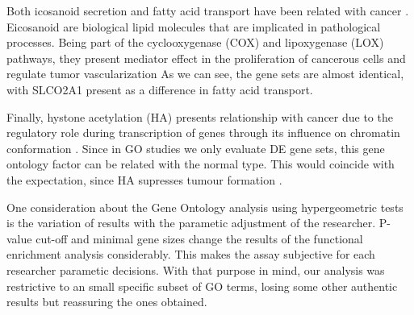 \documentclass[9pt,twocolumn,twoside]{gsajnl}
\begin{document}
Both icosanoid secretion and fatty acid transport have been related with cancer \citep{fat1,fat2}. Eicosanoid are biological lipid molecules that are implicated in pathological processes. Being part of the  cyclooxygenase (COX) and lipoxygenase (LOX) pathways, they present mediator effect in the proliferation of cancerous cells and regulate tumor vascularization \citep{fatvascu} As we can see, the gene sets are almost identical, with SLCO2A1 present as a difference in fatty acid transport.

Finally, hystone acetylation (HA) presents relationship with cancer due to the regulatory role during transcription of genes through its influence on chromatin conformation \citep{histoneacet, histoneacet2, histoneacet3, histoneacet4}. Since in GO studies we only evaluate DE gene sets, this gene ontology factor can be related with the normal type. This would coincide with the expectation, since HA supresses tumour formation \cite{histonea}.


One consideration about the Gene Ontology analysis using hypergeometric tests is the variation of results with the parametic adjustment of the researcher. P-value cut-off and minimal gene sizes change the results of the functional enrichment analysis considerably. This makes the assay subjective for each researcher parametic decisions. With that purpose in mind, our analysis was restrictive to an small specific subset of GO terms, losing some other authentic results but reassuring the ones obtained.
\end{document}

